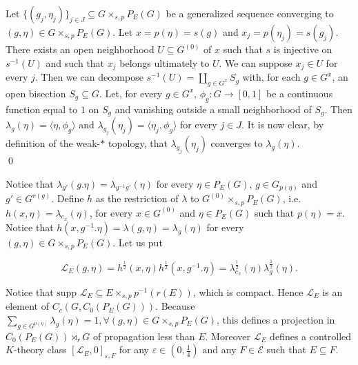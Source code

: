 \begin{dem}
Let $\{(g_j,\eta_j)\}_{j\in J}\subseteq G\times_{s,p}P_E(G)$ be a generalized sequence converging to $(g,\eta)\in G\times_{s,p}P_E(G)$. Let $x=p(\eta) = s(g)$ and $x_j=p(\eta_j) = s(g_j)$. There exists an open neighborhood $U\subseteq G^{(0)}$ of $x$ such that $s$ is injective on $s^{-1}(U)$ and such that $x_j$ belongs ultimately to $U$. We can suppose $x_j\in U$ for every $j$. Then we can decompose $s^{-1}(U) = \coprod_{g\in G^x} S_g$ with, for each $g\in G^x$, an open bisection $S_g\subseteq G$. Let, for every $g\in G^x$, $\phi_g : G\rightarrow [0,1]$ be a continuous function equal to $1$ on $S_g$ and vanishing outside a small neighborhood of $S_g$. Then $\lambda_g(\eta) =\langle \eta,\phi_g\rangle$ and $\lambda_{g_j}(\eta_j) = \langle \eta_j,\phi_g\rangle$ for every $j\in J$. It is now clear, by definition of the weak-$*$ topology, that $\lambda_{g_j}(\eta_j)$ converges to $\lambda_{g}(\eta)$.  \\
\qed %
\end{dem}

Notice that $\lambda_{g'}(g.\eta) = \lambda_{g^{-1}g'}(\eta)$ for every $\eta\in P_E(G)$, $g\in G_{p(\eta)}$ and $g'\in G^{r(g)}$. Define $h$ as the restriction of $\lambda$ to $G^{(0)}\times_{s,p}P_E(G)$, i.e. $h(x,\eta) = \lambda_{e_x}(\eta)$, for every $x\in G^{(0)}$ and $\eta\in P_E(G)$ such that $p(\eta) = x$. Notice that $h(x,g^{-1}.\eta)= \lambda(g,\eta) = \lambda_g(\eta)$ for every $(g,\eta)\in G\times_{s,p} P_E(G)$. Let us put
 
\[\mathcal L_E(g,\eta) = h^{\frac{1}{2}}(x,\eta) h^{\frac{1}{2}}(x,g^{-1}.\eta)= \lambda_{e_x}^{\frac{1}{2}}(\eta)\lambda_g^{\frac{1}{2}}(\eta).\] 

Notice that $\text{supp }\mathcal L_E\subseteq E\times_{s,p} p^{-1}(r(E))$, which is compact. Hence $\mathcal L_E$ is an element of $C_c(G,C_0(P_E(G)))$. Because $\sum_{g\in G^{p(\eta)}}\lambda_g(\eta) = 1 ,\forall (g,\eta)\in G\times_{s,p} P_E(G)$, this defines a projection in $C_0(P_E(G))\rtimes_r G$ of propagation less than $E$. Moreover $\mathcal L_E$ defines a controlled $K$-theory class $[\mathcal L_E,0]_{\varepsilon,F}$ for any $\varepsilon\in (0,\frac{1}{4})$ and any $F\in \mathcal E$ such that $E\subseteq F$.\\ %

